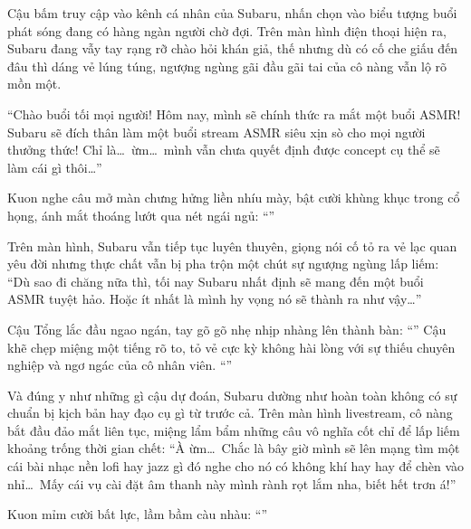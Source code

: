 \documentclass[../main.tex]{subfiles}
\begin{document}
Cậu bấm truy cập vào kênh cá nhân của Subaru, nhấn chọn vào biểu tượng buổi phát sóng đang có hàng ngàn người chờ đợi. Trên màn hình điện thoại hiện ra, Subaru đang vẫy tay rạng rỡ chào hỏi khán giả, thế nhưng dù có cố che giấu đến đâu thì dáng vẻ lúng túng, ngượng ngùng gãi đầu gãi tai của cô nàng vẫn lộ rõ mồn một.

``Chào buổi tối mọi người! Hôm nay, mình sẽ chính thức ra mắt một buổi ASMR! Subaru sẽ đích thân làm một buổi stream ASMR siêu xịn sò cho mọi người thưởng thức! Chỉ là\dots\ ừm\dots\ mình vẫn chưa quyết định được concept cụ thể sẽ làm cái gì thôi\dots''


Kuon nghe câu mở màn chưng hửng liền nhíu mày, bật cười khùng khục trong cổ họng, ánh mắt thoáng lướt qua nét ngái ngủ: ``''

Trên màn hình, Subaru vẫn tiếp tục luyên thuyên, giọng nói cố tỏ ra vẻ lạc quan yêu đời nhưng thực chất vẫn bị pha trộn một chút sự ngượng ngùng lấp liếm: ``Dù sao đi chăng nữa thì, tối nay Subaru nhất định sẽ mang đến một buổi ASMR tuyệt hảo. Hoặc ít nhất là mình hy vọng nó sẽ thành ra như vậy\dots''

Cậu Tổng lắc đầu ngao ngán, tay gõ gõ nhẹ nhịp nhàng lên thành bàn: ``'' Cậu khẽ chẹp miệng một tiếng rõ to, tỏ vẻ cực kỳ không hài lòng với sự thiếu chuyên nghiệp và ngơ ngác của cô nhân viên. ``''

Và đúng y như những gì cậu dự đoán, Subaru dường như hoàn toàn không có sự chuẩn bị kịch bản hay đạo cụ gì từ trước cả. Trên màn hình livestream, cô nàng bắt đầu đảo mắt liên tục, miệng lẩm bẩm những câu vô nghĩa cốt chỉ để lấp liếm khoảng trống thời gian chết: ``À ừm\dots\ Chắc là bây giờ mình sẽ lên mạng tìm một cái bài nhạc nền lofi hay jazz gì đó nghe cho nó có không khí hay hay để chèn vào nhỉ\dots\ Mấy cái vụ cài đặt âm thanh này mình rành rọt lắm nha, biết hết trơn á!''

Kuon mỉm cười bất lực, lầm bầm càu nhàu: ``''
\end{document}
